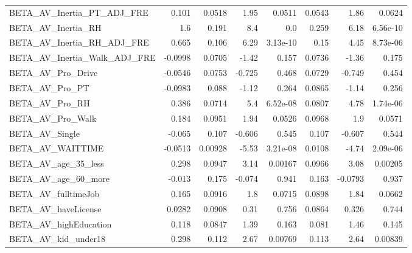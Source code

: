 \begin{tabular}{lrrrrrrr}
BETA\_AV\_Inertia\_PT\_ADJ\_FRE       &     0.101 &   0.0518 &      1.95 &   0.0511 &        0.0543 &         1.86 &        0.0624 \\
BETA\_AV\_Inertia\_RH               &       1.6 &    0.191 &       8.4 &      0.0 &         0.259 &         6.18 &      6.56e-10 \\
BETA\_AV\_Inertia\_RH\_ADJ\_FRE       &     0.665 &    0.106 &      6.29 & 3.13e-10 &          0.15 &         4.45 &      8.73e-06 \\
BETA\_AV\_Inertia\_Walk\_ADJ\_FRE     &   -0.0998 &   0.0705 &     -1.42 &    0.157 &        0.0736 &        -1.36 &         0.175 \\
BETA\_AV\_Pro\_Drive                &   -0.0546 &   0.0753 &    -0.725 &    0.468 &        0.0729 &       -0.749 &         0.454 \\
BETA\_AV\_Pro\_PT                   &   -0.0983 &    0.088 &     -1.12 &    0.264 &        0.0865 &        -1.14 &         0.256 \\
BETA\_AV\_Pro\_RH                   &     0.386 &   0.0714 &       5.4 & 6.52e-08 &        0.0807 &         4.78 &      1.74e-06 \\
BETA\_AV\_Pro\_Walk                 &     0.184 &   0.0951 &      1.94 &   0.0526 &        0.0968 &          1.9 &        0.0571 \\
BETA\_AV\_Single                   &    -0.065 &    0.107 &    -0.606 &    0.545 &         0.107 &       -0.607 &         0.544 \\
BETA\_AV\_WAITTIME                 &   -0.0513 &  0.00928 &     -5.53 & 3.21e-08 &        0.0108 &        -4.74 &      2.09e-06 \\
BETA\_AV\_age\_35\_less              &     0.298 &   0.0947 &      3.14 &  0.00167 &        0.0966 &         3.08 &       0.00205 \\
BETA\_AV\_age\_60\_more              &    -0.013 &    0.175 &    -0.074 &    0.941 &         0.163 &      -0.0793 &         0.937 \\
BETA\_AV\_fulltimeJob              &     0.165 &   0.0916 &       1.8 &   0.0715 &        0.0898 &         1.84 &        0.0662 \\
BETA\_AV\_haveLicense              &    0.0282 &   0.0908 &      0.31 &    0.756 &        0.0864 &        0.326 &         0.744 \\
BETA\_AV\_highEducation            &     0.118 &   0.0847 &      1.39 &    0.163 &         0.081 &         1.46 &         0.145 \\
BETA\_AV\_kid\_under18              &     0.298 &    0.112 &      2.67 &  0.00769 &         0.113 &         2.64 &       0.00839 \\

\end{tabular}

